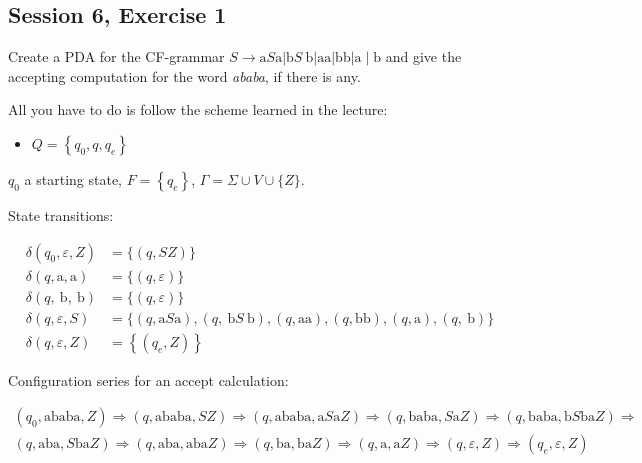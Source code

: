 \subsection {Session 6, Exercise 1}


Create a PDA for the CF-grammar $ S \rightarrow \mathrm {a} S \mathrm {a} | \mathrm {b} S \mathrm {~ b} | \mathrm {aa} | \mathrm {bb} | \mathrm {a} \mid \mathrm {b} $ and give the accepting computation for the word \textit{ababa}, if there is any.


All you have to do is follow the scheme learned in the lecture:

\begin{itemize}
    \item $Q = \left \{q_ {0}, q, q_ {e} \right \}$
\end{itemize}

$q_ {0} $ a starting state, $ F = \left \{q_ {e } \right \} $, $ \Gamma = \Sigma \cup V \cup \{Z \} $.

State transitions:

\begin{align*}
\delta \left (q_ {0}, \varepsilon, Z \right) & = \{(q, S Z) \} \\
\delta (q, \mathrm {a}, \mathrm {a}) & = \{(q, \varepsilon) \} \\
\delta (q, \mathrm {~ b}, \mathrm {~ b}) & = \{(q, \varepsilon) \} \\
\delta (q, \varepsilon, S) & = \{(q, \mathrm {a} S \mathrm {a}), (q, \mathrm {~ b} S \mathrm {~ b}), (q , \mathrm {aa}), (q, \mathrm {bb}), (q, \mathrm {a}), (q, \mathrm {~ b}) \} \\
\delta (q, \varepsilon, Z) & = \left \{\left (q_ {e}, Z \right) \right \}
\end{align*}


Configuration series for an accept calculation:

$$
\begin {gathered}
\left (q_ {0}, \mathrm {ababa}, Z \right) \Rightarrow (q, \mathrm {ababa}, SZ) \Rightarrow (q, \mathrm {ababa}, \mathrm {a} S \mathrm {a} Z) \Rightarrow (q, \mathrm {baba}, S \mathrm {a} Z) \Rightarrow (q, \mathrm {baba}, \mathrm {b} S \mathrm {ba} Z) \Rightarrow \\
(q, \mathrm {aba}, S \mathrm {ba} Z) \Rightarrow (q, \mathrm {aba}, \mathrm {aba} Z) \Rightarrow (q, \mathrm {ba}, \mathrm {ba } Z) \Rightarrow (q, \mathrm {a}, \mathrm {a} Z) \Rightarrow (q, \varepsilon, Z) \Rightarrow \left (q_ {e}, \varepsilon, Z \right)
\end {gathered}
$$